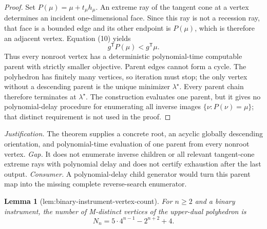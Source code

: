 \documentclass{article}
\newtheorem{lemma}{Lemma}
\begin{document}
\begin{proof}
Set \(P(\mu)=\mu+t_\mu h_\mu\). An extreme ray of the tangent cone at a vertex determines an incident one-dimensional face. Since this ray is not a recession ray, that face is a bounded edge and its other endpoint is \(P(\mu)\), which is therefore an adjacent vertex. Equation (10) yields
\[g^{\mathsf T}P(\mu)<g^{\mathsf T}\mu.\]
Thus every nonroot vertex has a deterministic polynomial-time computable parent with strictly smaller objective. Parent edges cannot form a cycle. The polyhedron has finitely many vertices, so iteration must stop; the only vertex without a descending parent is the unique minimizer \(\lambda^\star\). Every parent chain therefore terminates at \(\lambda^\star\). The construction evaluates one parent, but it gives no polynomial-delay procedure for enumerating all inverse images \(\{\nu:P(\nu)=\mu\}\); that distinct requirement is not used in the proof.
\end{proof}
\par\smallskip\noindent \textit{Justification.} The theorem supplies a concrete root, an acyclic globally descending orientation, and polynomial-time evaluation of one parent from every nonroot vertex. \textit{Gap.} It does not enumerate inverse children or all relevant tangent-cone extreme rays with polynomial delay and does not certify exhaustion after the last output. \textit{Consumer.} A polynomial-delay child generator would turn this parent map into the missing complete reverse-search enumerator.

\begin{lemma}[lem:binary-instrument-vertex-count]\label{lem:binary-instrument-vertex-count}
For \(n\ge2\) and a binary instrument, the number of M-distinct vertices of the upper-dual polyhedron is \[N_n=5\cdot4^{n-1}-2^{n+2}+4.\]
\end{lemma}
\end{document}
